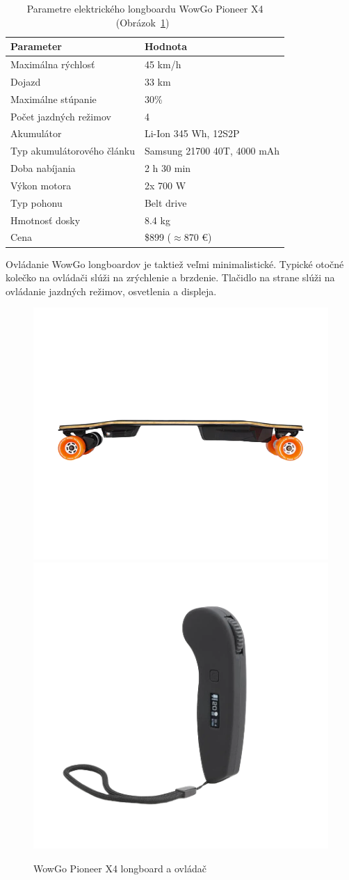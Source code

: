 \begin{table}[h]
    \centering
    \begin{tabular}{|l|l|}
        \hline
        \textbf{Parameter} & \textbf{Hodnota} \\ \hline
        Maximálna rýchlosť & 45 km/h \\ \hline
        Dojazd & 33 km \\ \hline
        Maximálne stúpanie & 30\% \\ \hline
        Počet jazdných režimov & 4 \\ \hline
        Akumulátor & Li-Ion 345 Wh, 12S2P \\ \hline
        Typ akumulátorového článku & Samsung 21700 40T, 4000 mAh \\ \hline
        Doba nabíjania & 2 h 30 min \\ \hline
        Výkon motora & 2x 700 W \\ \hline
        Typ pohonu & Belt drive \\ \hline
        Hmotnosť dosky & 8.4 kg \\ \hline
        Cena & \$899 ($\approx$870 €) \\ \hline
    \end{tabular}
    \caption{Parametre elektrického longboardu WowGo Pioneer X4 (Obrázok~\ref{fig:wowgo})~\cite{WowGo}}\label{tab:wowgo}
\end{table}

Ovládanie WowGo longboardov je taktiež veľmi minimalistické.
Typické otočné kolečko na ovládači slúži na zrýchlenie a brzdenie.
Tlačidlo na strane slúži na ovládanie jazdných režimov, osvetlenia a displeja.

\begin{figure}[h]
    \centering
    \includegraphics[width=0.48\linewidth]{obrazky-figures/brand-reviews/wowgo-longboard.png}\hfill
    \includegraphics[width=0.48\linewidth]{obrazky-figures/brand-reviews/wowgo-controller.png}
    \caption{WowGo Pioneer X4 longboard a ovládač\cite{WowGo}}\label{fig:wowgo}
\end{figure}

